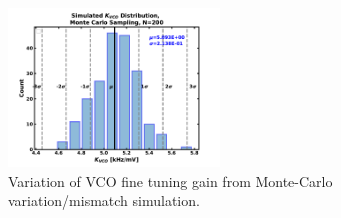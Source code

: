 		\begin{figure}[htb!]
	        \centering
	        \includegraphics[width=0.5\textwidth, angle=0]{./figs/results/kvco_pdf}
		    \caption{Variation of VCO fine tuning gain from Monte-Carlo variation/mismatch simulation.}
		    \label{fig:kvco_variation}
		\end{figure}

	\FloatBarrier
